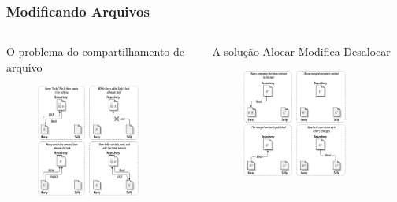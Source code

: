 \documentclass{beamer}
\begin{document}
\begin{frame}
    \frametitle{Modificando Arquivos}
    \begin{columns}
        \begin{column}{.5\textwidth}
            \begin{block}{O problema do compartilhamento de arquivo}
                \begin{figure}
                    \includegraphics[width=0.8\textwidth]{figures/lockmodifyunlock}
                \end{figure}
            \end{block}
        \end{column}
        \begin{column}{.5\textwidth}
            \begin{block}{A solu\c{c}\~ao Alocar-Modifica-Desalocar}
                \begin{figure}
                    \includegraphics[width=0.8\textwidth]{figures/copymodifymerge}

\end{figure}
\end{block}
\end{column}
\end{columns}
\end{frame}
\end{document}
